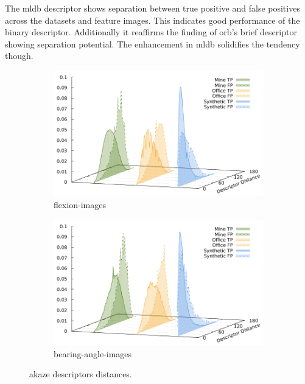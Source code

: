 The \acrshort{mldb} descriptor shows separation between true positive and false positives across the datasets and feature images.
This indicates good performance of the binary descriptor.
Additionally it reaffirms the finding of \acrshort{orb}'s \acrshort{brief} descriptor showing separation potential.
The enhancement in \acrshort{mldb} solidifies the tendency though.
\begin{figure}[htp]
\begin{subfigure}[t]{0.45\linewidth}
    \includegraphics[width=\linewidth]{chapter06/results/AKAZE/flexion/descriptor_distances.pdf}%
    \caption{\glspl{flexion-image}}
\end{subfigure}\quad
\begin{subfigure}[t]{0.45\linewidth}
    \includegraphics[width=\linewidth]{chapter06/results/AKAZE/bearing/descriptor_distances.pdf}%
    \caption{\glspl{bearing-angle-image}}
\end{subfigure}
    \caption{\acrshort{akaze} descriptors distances.}
\end{figure}
